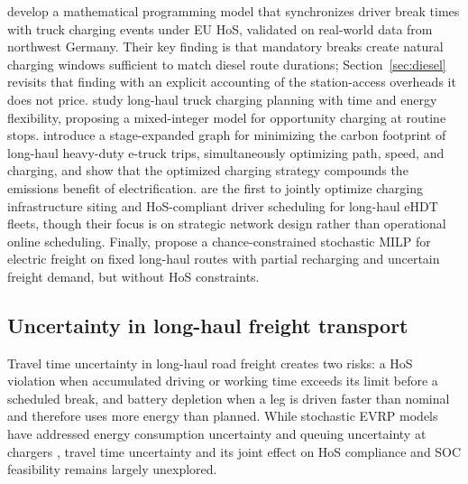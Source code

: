 \documentclass[preprint,12pt,3p]{elsarticle}
\newcommand{\FIX}[1]{{\color{annred}#1}}
\begin{document}
\citet{brockmann_break-and-charge_2025} develop a mathematical programming model that synchronizes driver break times with truck charging events under EU HoS, validated on real-world data from northwest Germany. Their key finding is that mandatory breaks create natural charging windows sufficient to match diesel route durations\FIX{; Section~\ref{sec:diesel} revisits that finding with an explicit accounting of the station-access overheads it does not price}. \citet{wan_long-haul_2024} study long-haul truck charging planning with time and energy flexibility, proposing a mixed-integer model for opportunity charging at routine stops. \citet{su_optimizing_2025} introduce a stage-expanded graph for minimizing the carbon footprint of long-haul heavy-duty e-truck trips, simultaneously optimizing path, speed, and charging, and show that the optimized charging strategy compounds the emissions benefit of electrification. \citet{vidotte_plaza_charger_2026} are the first to jointly optimize charging infrastructure siting and HoS-compliant driver scheduling for long-haul eHDT fleets, though their focus is on strategic network design rather than operational online scheduling. Finally, \citet{niyomphon_stochastic_2026} propose a chance-constrained stochastic MILP for electric freight on fixed long-haul routes with partial recharging and uncertain freight demand, but without HoS constraints.

\subsection{Uncertainty in long-haul freight transport} \label{sec:uncertaintylit}
Travel time uncertainty in long-haul road freight creates two risks: a HoS violation when accumulated driving or working time exceeds its limit before a scheduled break, and battery depletion when a leg \FIX{is driven faster than nominal and therefore} uses more energy than planned. While stochastic EVRP models have addressed energy consumption uncertainty \citep{pelletier_electric_2019} and queuing uncertainty at chargers \citep{keskin_simulation-based_2021}, travel time uncertainty and its joint effect on HoS compliance and SOC feasibility remains largely unexplored.
\end{document}
